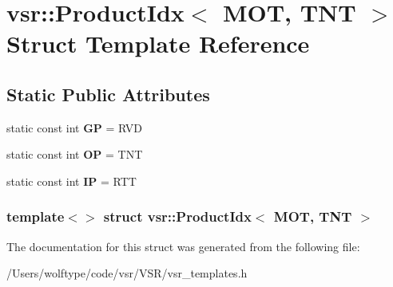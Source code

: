 \hypertarget{structvsr_1_1_product_idx_3_01_m_o_t_00_01_t_n_t_01_4}{\section{vsr\-:\-:Product\-Idx$<$ M\-O\-T, T\-N\-T $>$ Struct Template Reference}
\label{structvsr_1_1_product_idx_3_01_m_o_t_00_01_t_n_t_01_4}
}
\subsection*{Static Public Attributes}
\begin{DoxyCompactItemize}
\item 
\hypertarget{structvsr_1_1_product_idx_3_01_m_o_t_00_01_t_n_t_01_4_acf281acdb9a9a3b871bc52d494e66867}{static const int {\bfseries G\-P} = R\-V\-D}\label{structvsr_1_1_product_idx_3_01_m_o_t_00_01_t_n_t_01_4_acf281acdb9a9a3b871bc52d494e66867}

\item 
\hypertarget{structvsr_1_1_product_idx_3_01_m_o_t_00_01_t_n_t_01_4_ade243575f8f4cb4c906e50b328e590de}{static const int {\bfseries O\-P} = T\-N\-T}\label{structvsr_1_1_product_idx_3_01_m_o_t_00_01_t_n_t_01_4_ade243575f8f4cb4c906e50b328e590de}

\item 
\hypertarget{structvsr_1_1_product_idx_3_01_m_o_t_00_01_t_n_t_01_4_a98192c64178b1944d41fb5c1e69da0c9}{static const int {\bfseries I\-P} = R\-T\-T}\label{structvsr_1_1_product_idx_3_01_m_o_t_00_01_t_n_t_01_4_a98192c64178b1944d41fb5c1e69da0c9}

\end{DoxyCompactItemize}
\subsubsection*{template$<$$>$ struct vsr\-::\-Product\-Idx$<$ M\-O\-T, T\-N\-T $>$}



The documentation for this struct was generated from the following file\-:\begin{DoxyCompactItemize}
\item 
/\-Users/wolftype/code/vsr/\-V\-S\-R/vsr\-\_\-templates.\-h\end{DoxyCompactItemize}

